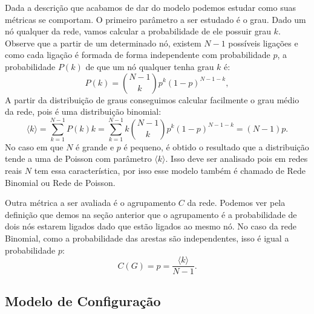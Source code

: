 Dada a descrição que acabamos de dar do modelo podemos estudar como suas métricas se comportam. O primeiro parâmetro a ser estudado é o grau. Dado um nó qualquer da rede,
vamos calcular a probabilidade de ele possuir grau $k$. Observe que a partir de um determinado nó, existem $N-1$ possíveis ligações e como cada ligação é formada de forma independente com probabilidade $p$,
a probabilidade $P(k)$ de que um nó qualquer tenha grau $k$ é:
\begin{equation}
  P(k) = \binom{N - 1}{k} p^k(1-p)^{N - 1 - k},
\end{equation}
A partir da distribuição de graus conseguimos calcular facilmente o grau médio da rede, pois é uma distribuição binomial:
\begin{equation}
  \langle k \rangle = \sum_{k = 1}^{N - 1}P(k)k = \sum_{k = 1}^{N - 1}k \binom{N - 1}{k}p^k(1-p)^{N - 1 - k} = (N - 1)p.
\end{equation}
No caso em que $N$ é grande e $p$ é pequeno, é obtido o resultado que a distribuição tende a uma de Poisson 
com parâmetro $\langle k \rangle$. 
Isso deve ser analisado pois em redes reais $N$ tem essa característica, por isso esse modelo também é chamado de Rede Binomial ou Rede de Poisson. 

Outra métrica a ser avaliada é o agrupamento $C$ da rede. Podemos ver pela definição que demos na seção anterior que o agrupamento é a probabilidade de dois nós estarem ligados dado que estão ligados ao mesmo nó. 
No caso da rede Binomial, como a probabilidade das arestas são independentes,
isso é 
igual 
a probabilidade $p$:
\begin{equation}
  C(G) = p = \frac{\langle k \rangle}{N - 1}.
\end{equation}

\subsection{Modelo de Configuração}

